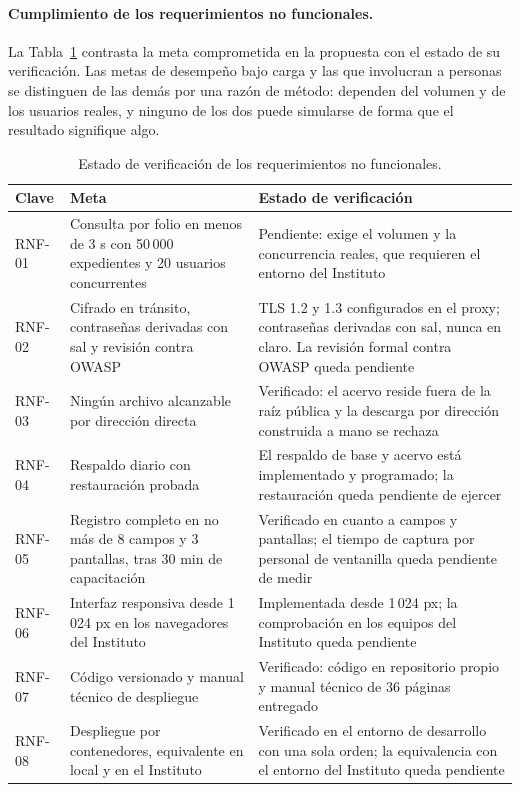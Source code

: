 \paragraph{Cumplimiento de los requerimientos no funcionales.}
La Tabla~\ref{tab:resultados_rnf} contrasta la meta comprometida en la propuesta con el estado de su verificación. Las metas de desempeño bajo carga y las que involucran a personas se distinguen de las demás por una razón de método: dependen del volumen y de los usuarios reales, y ninguno de los dos puede simularse de forma que el resultado signifique algo.

\begin{table}[H]
  \centering
  \small
  \renewcommand{\arraystretch}{1.3}
  \caption{Estado de verificación de los requerimientos no funcionales.}
  \label{tab:resultados_rnf}
  \begin{tabularx}{\textwidth}{@{}>{\raggedright\arraybackslash}p{1.6cm}>{\raggedright\arraybackslash}p{5.2cm}>{\raggedright\arraybackslash}X@{}}
    \toprule
    \textbf{Clave} & \textbf{Meta} & \textbf{Estado de verificación} \\
    \midrule
    RNF-01 & Consulta por folio en menos de 3 s con 50\,000 expedientes y 20 usuarios concurrentes & Pendiente: exige el volumen y la concurrencia reales, que requieren el entorno del Instituto \\
    RNF-02 & Cifrado en tránsito, contraseñas derivadas con sal y revisión contra OWASP & TLS 1.2 y 1.3 configurados en el proxy; contraseñas derivadas con sal, nunca en claro. La revisión formal contra OWASP queda pendiente \\
    RNF-03 & Ningún archivo alcanzable por dirección directa & Verificado: el acervo reside fuera de la raíz pública y la descarga por dirección construida a mano se rechaza \\
    RNF-04 & Respaldo diario con restauración probada & El respaldo de base y acervo está implementado y programado; la restauración queda pendiente de ejercer \\
    RNF-05 & Registro completo en no más de 8 campos y 3 pantallas, tras 30 min de capacitación & Verificado en cuanto a campos y pantallas; el tiempo de captura por personal de ventanilla queda pendiente de medir \\
    RNF-06 & Interfaz responsiva desde 1\,024 px en los navegadores del Instituto & Implementada desde 1\,024 px; la comprobación en los equipos del Instituto queda pendiente \\
    RNF-07 & Código versionado y manual técnico de despliegue & Verificado: código en repositorio propio y manual técnico de 36 páginas entregado \\
    RNF-08 & Despliegue por contenedores, equivalente en local y en el Instituto & Verificado en el entorno de desarrollo con una sola orden; la equivalencia con el entorno del Instituto queda pendiente \\
    \bottomrule
  \end{tabularx}
\end{table}

